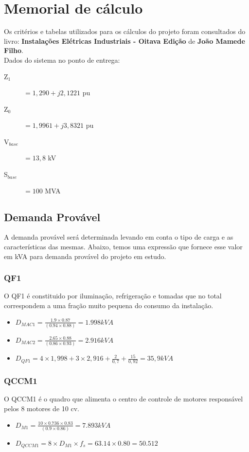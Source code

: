 
\section{Memorial de cálculo}
Os critérios e tabelas utilizados para os cálculos do projeto foram consultados do livro: \textbf{Instalações Elétricas Industriais - Oitava Edição} de \textbf{João Mamede Filho}.\\
Dados do sistema no ponto de entrega:
\begin{description}
\item[Z$_{1}$]$=1,290+j2,1221$ pu
\item[Z$_{0}$]$=1,9961+j3,8321$ pu
\item[V$_{base}$]$=13,8$ kV
\item[S$_{base}$]$=100$ MVA
\end{description}

\subsection{Demanda Provável}
A demanda provável será determinada levando em conta o tipo de carga e as características das
mesmas. Abaixo, temos uma expressão que fornece esse valor em kVA para demanda provável do projeto
em estudo.
\subsubsection{QF1}
O QF1 é constituido por iluminação, refrigeração e tomadas que no total correspondem a uma fração muito pequena do consumo da instalação.
\begin{itemize}
\item $D_{MAC1}=\frac{1.9 \times0.87}{(0.94\times0.88)} = 1.998kVA$ 
\item $D_{MAC2}=\frac{2.65\times0.88}{(0.86\times0.93)} = 2.916kVA$
\item $D_{QF1} = 4\times 1,998+3\times 2,916 + \frac{2}{0,7}+\frac{15}{0,92} = 35,9kVA$
\end{itemize}
	
\subsubsection{QCCM1}
O QCCM1 é o quadro que alimenta o centro de controle de motores responsável pelos 8 motores de 10 cv.
\begin{itemize}
\item $D_{M1}= \frac{10\times0.736\times0.83}{(0.9\times0.86)}= 7.893kVA $
\item $D_{QCCM1} = 8\times D_{M1}\times f_s = 63.14\times0.80 = 50.512$
\end{itemize}
	

